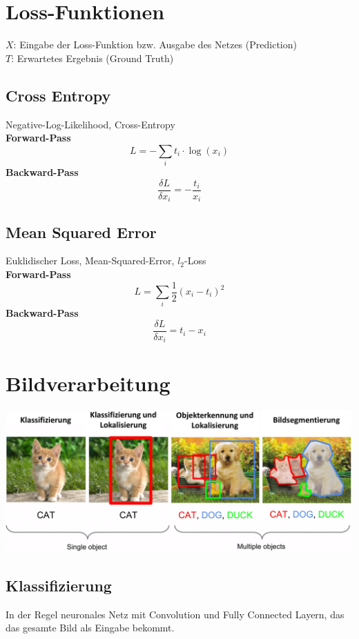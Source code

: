 \documentclass[12pt]{article}
\begin{document}
	\section{Loss-Funktionen}
	$X$: Eingabe der Loss-Funktion bzw. Ausgabe des Netzes (Prediction)\\
	$T$: Erwartetes Ergebnis (Ground Truth)
	\subsection{Cross Entropy}
	Negative-Log-Likelihood, Cross-Entropy\\
	\textbf{Forward-Pass} $$L = -\sum_i t_i \cdot \log(x_i)$$
	\textbf{Backward-Pass} $$\frac{\delta L}{\delta x_i} = -\frac{t_i}{x_i}$$
	\subsection{Mean Squared Error}
	Euklidischer Loss, Mean-Squared-Error, $l_2$-Loss\\
	\textbf{Forward-Pass} $$L = \sum_i \frac{1}{2} (x_i - t_i)^2$$
	\textbf{Backward-Pass} $$\frac{\delta L}{\delta x_i} = t_i - x_i$$

	\section{Bildverarbeitung}
	\includegraphics[width=\linewidth]{figures/bildverarbeitung.png}
	\subsection{Klassifizierung}
	In der Regel neuronales Netz mit Convolution und Fully Connected Layern, das das gesamte Bild als Eingabe bekommt.
\end{document}
